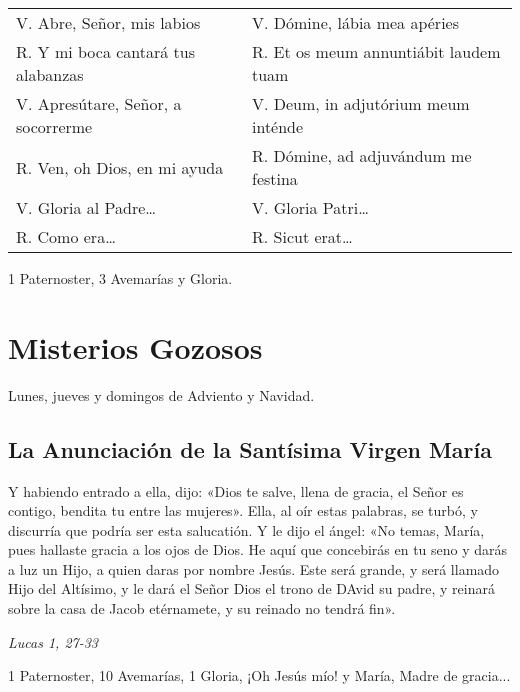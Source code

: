 \documentclass[11pt,a4paper]{book}
\begin{document}
    \begin{longtable} {p{} p{} }
        V. Abre, Señor, mis labios & V. Dómine, lábia mea apéries\\
        R. Y mi boca cantará tus alabanzas & R. Et os meum annuntiábit laudem tuam\\
        V. Apresútare, Señor, a socorrerme & V. Deum, in adjutórium meum inténde\\
        R. Ven, oh Dios, en mi ayuda & R. Dómine, ad adjuvándum me festina\\ 
        V. Gloria al Padre{\ldots} & V. Gloria Patri{\ldots}\\
        R. Como era{\ldots} & R. Sicut erat{\ldots}\\
    \end{longtable}

    

    \begin{center}
        1 Paternoster, 3 Avemarías y Gloria.
    \end{center}

    
    \section*{Misterios Gozosos}
    Lunes, jueves y domingos de Adviento y Navidad.

    \subsection*{La Anunciación de la Santísima Virgen María}
    Y habiendo entrado a ella, dijo: «Dios te salve, llena de gracia, el Señor es contigo, bendita tu entre las mujeres». 
    Ella, al oír estas palabras, se turbó, y discurría que podría ser esta salucatión. Y le dijo el ángel: «No temas, María, 
    pues hallaste gracia a los ojos de Dios. He aquí que concebirás en tu seno y darás a luz un Hijo, a quien daras por 
    nombre Jesús. Este será grande, y será llamado Hijo del Altísimo, y le dará el Señor Dios el trono de DAvid su padre, 
    y reinará sobre la casa de Jacob etérnamete, y su reinado no tendrá fin».

    \begin{flushright}
        \emph{Lucas 1, 27-33}
    \end{flushright}

    1 Paternoster, 10 Avemarías, 1 Gloria, ¡Oh Jesús mío! y María, Madre de gracia...
\end{document}
